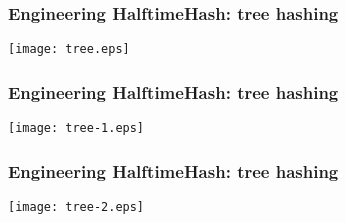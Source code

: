 \documentclass[xcolor=dvipsnames]{beamer}
\newcommand{\defeq}{\;\genfrac{}{}{0pt}{2}{\text{def}}{=}\;}
\DeclareMathOperator{\adj}{adj}
\begin{document}
\begin{frame}
  \frametitle{Engineering HalftimeHash: tree hashing}
  \begin{center}
    \texttt{[image: tree.eps]}
  \end{center}
\end{frame}

\begin{frame}
  \frametitle{Engineering HalftimeHash: tree hashing}
  \begin{center}
    \texttt{[image: tree-1.eps]}
  \end{center}
\end{frame}

\begin{frame}
  \frametitle{Engineering HalftimeHash: tree hashing}
  \begin{center}
    \texttt{[image: tree-2.eps]}
  \end{center}
\end{frame}








\end{document}
